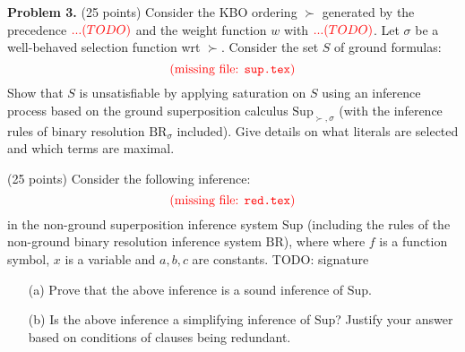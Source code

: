 \documentclass{article}[8pt]
\newcommand{\red}[1]{{\color{red}#1}}
\newcommand{\InputIfExists}[1]{%
    \InputIfFileExists{#1}{}{\red{\mbox{(missing file: \texttt{#1})}}}
}
\begin{document}
\noindent
{\bf Problem 3.} (25 points)
Consider the KBO ordering $\succ$ generated by the precedence
$ \red{... (TODO)} $ and the weight function $w$ with $ \red{... (TODO)} $.
Let $\sigma$ be a well-behaved selection function
wrt $\succ$.  Consider the set $S$ of ground formulas:
\[ \InputIfExists{sup.tex} \]
\noindent Show that $S$ is unsatisfiable by applying saturation on $S$ using an
inference process based on the ground superposition
calculus $\textrm{Sup}_{\succ,\sigma}$ (with the inference rules of
binary  resolution $\textrm{BR}_{\sigma}$ included).
 Give details on what literals
 are selected and which terms are maximal. \bigskip







 (25 points)
Consider the following inference:
\[ \InputIfExists{red.tex} \]
in the non-ground
superposition inference system $\textrm{Sup}$ (including the rules of the non-ground
binary resolution  inference system $\textrm{BR}$), where
where $f$ is a function symbol, %
$x$ is a variable and $a,b,c$ are constants.
\red{TODO: signature}
%
\begin{itemize}
    \item[(a)]
        Prove that the above inference is a sound inference of $\textrm{Sup}$.
    \item[(b)]
        Is the above inference a simplifying inference of $\textrm{Sup}$?
        Justify your answer based on conditions of clauses being redundant.
\end{itemize}
\end{document}
